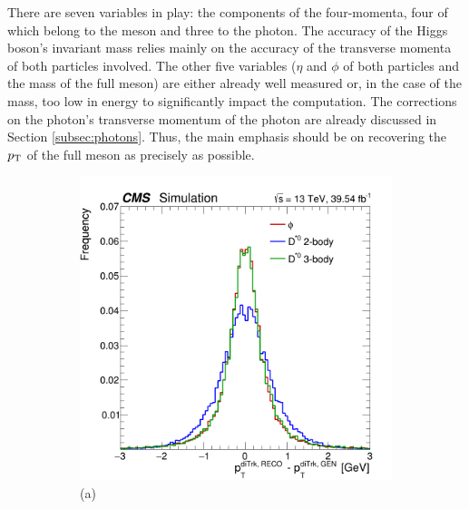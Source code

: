 There are seven variables in play: the components of the four-momenta, four of which belong to the meson and three to the photon. The accuracy of the Higgs boson's invariant mass relies mainly on the accuracy of the transverse momenta of both particles involved. The other five variables ($\eta$ and $\phi$ of both particles and the mass of the full meson) are either already well measured or, in the case of the mass, too low in energy to significantly impact the computation. The corrections on the photon's transverse momentum of the photon are already discussed in Section \ref{subsec:photons}. Thus, the main emphasis should be on recovering the $p_\text{T}$ of the full meson as precisely as possible.
\begin{figure}[!ht]
    \captionsetup[subfigure]{labelformat=empty}
    \vspace*{-0.2cm}
    \centering
    \setlength{\mylength}{\textwidth}
    \begin{subfigure}[t]{0.50\mylength}
            \centering
            \includegraphics[width=0.49\mylength]{resources/plots/ditrack_residuals_pt.png}
            \vspace*{-0.2cm}
            \caption{\footnotesize (a)}
    \end{subfigure}%
    \begin{subfigure}[t]{0.50\mylength}
            \centering

\end{subfigure}
\end{figure}
